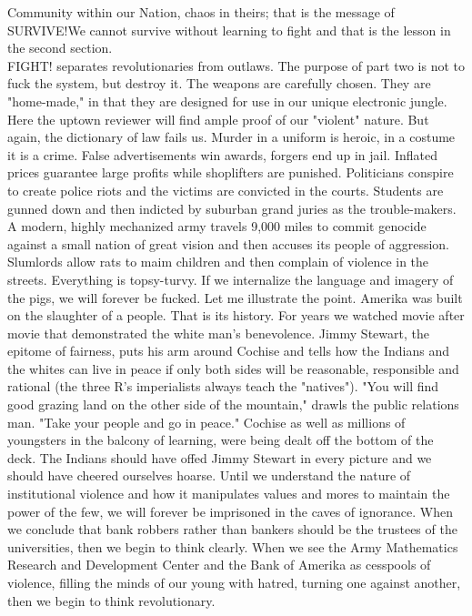 \documentclass[11pt,twoside,a4paper]{book}
\begin{document}
Community within our Nation, chaos in theirs; that is the message of SURVIVE!We cannot survive without learning to fight and that is the lesson in the second section.~\\ 
	
FIGHT! separates revolutionaries from outlaws. The purpose of part two is not to fuck the system, but destroy it. The weapons are carefully chosen. They are "home-made," in that they are designed for use in our unique electronic jungle. Here the uptown reviewer will find ample proof of our "violent" nature. But again, the dictionary of law fails us. Murder in a uniform is heroic, in a costume it is a crime. False advertisements win awards, forgers end up in jail. Inflated prices guarantee large profits while shoplifters are punished. Politicians conspire to create police riots and the victims are convicted in the courts. Students are gunned down and then indicted by suburban grand juries as the trouble-makers. A modern, highly mechanized army travels 9,000 miles to commit genocide against a small nation of great vision and then accuses its people of aggression. Slumlords allow rats to maim children and then complain of violence in the streets. Everything is topsy-turvy. If we internalize the language and imagery of the pigs, we will forever be fucked. Let me illustrate the point. Amerika was built on the slaughter of a people. That is its history. For years we watched movie after movie that demonstrated the white man's benevolence. Jimmy Stewart, the epitome of fairness, puts his arm around Cochise and tells how the Indians and the whites can live in peace if only both sides will be reasonable, responsible and rational (the three R's imperialists always teach the "natives"). "You will find good grazing land on the other side of the mountain," drawls the public relations man. "Take your people and go in peace." Cochise as well as millions of youngsters in the balcony of learning, were being dealt off the bottom of the deck. The Indians should have offed Jimmy Stewart in every picture and we should have cheered ourselves hoarse. Until we understand the	nature of institutional violence and how it manipulates values and mores to maintain the power of the few, we will forever be imprisoned in the caves of ignorance. When we conclude that bank robbers rather than bankers should be the trustees of the universities, then we begin to think clearly. When we see the Army Mathematics Research and Development Center and the Bank of Amerika as cesspools of violence, filling the minds of our young with hatred, turning one against another, then we begin to think revolutionary.~\\
\end{document}
